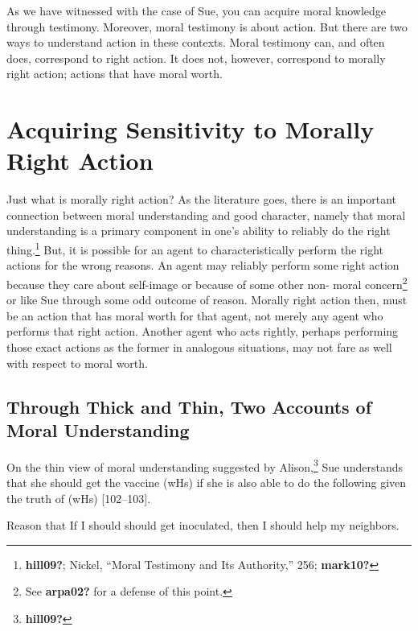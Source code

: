 \documentclass[
  12pt,
]{book}
\newenvironment{Shaded}{\begin{snugshade}}{\end{snugshade}}
\newcommand{\NormalTok}[1]{#1}
\theoremstyle{definition}
\theoremstyle{definition}
\theoremstyle{definition}
\theoremstyle{definition}
\theoremstyle{remark}
\begin{document}
As we have witnessed with the case of Sue, you can acquire moral knowledge through testimony. Moreover, moral testimony is about action. But there are two ways to understand action in these contexts. Moral testimony can, and often does, correspond to right action. It does not, however, correspond to morally right action; actions that have moral worth.

\section{Acquiring Sensitivity to Morally Right Action}\label{acquiring-sensitivity-to-morally-right-action}

Just what is morally right action? As the literature goes, there is an important connection between moral understanding and good character, namely that moral understanding is a primary component in one's ability to reliably do the right thing.\footnote{\textbf{hill09?}; Nickel, {``Moral {Testimony} and Its {Authority},''} 256; \textbf{mark10?}} But, it is possible for an agent to characteristically perform the right actions for the wrong reasons. An agent may reliably perform some right action because they care about self-image or because of some other non- moral concern\footnote{See \textbf{arpa02?} for a defense of this point.} or like Sue through some odd outcome of reason. Morally right action then, must be an action that has moral worth for that agent, not merely any agent who performs that right action. Another agent who acts rightly, perhaps performing those exact actions as the former in analogous situations, may not fare as well with respect to moral worth.

\subsection*{Through Thick and Thin, Two Accounts of Moral Understanding}\label{through-thick-and-thin-two-accounts-of-moral-understanding}

On the thin view of moral understanding suggested by Alison,\footnote{\textbf{hill09?}} Sue understands that she should get the vaccine (wHs) if she is also able to do the following given the truth of (wHs) {[}102--103{]}.

\begin{Shaded}
\begin{Highlighting}[]

\NormalTok{Reason that \textquotesingle{}If I should should get inoculated, then I should help my neighbors.\textquotesingle{}}
\end{Highlighting}
\end{Shaded}
\end{document}

